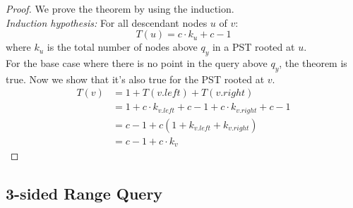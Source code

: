 \begin{proof}
We prove the theorem by using the induction.\\
\textit{Induction hypothesis:} For all descendant nodes $u$ of $v$:
\begin{equation*}
    T(u) = c\cdot k_u + c-1
\end{equation*}
where $k_u$ is the total number of nodes above $q_y$ in a PST rooted at $u$.\\

For the base case where there is no point in the query above $q_y$, the theorem is true. Now we show that it's also true for the PST rooted at $v$.
\begin{align*}
    T(v) &= 1 + T(v.left)+ T(v.right)\\
    &= 1 + c\cdot k_{v.left} + c-1 + c\cdot k_{v.right} + c-1 \\
    &= c-1 + c(1+k_{v.left}+k_{v.right})\\
    &= c-1 + c\cdot k_v
\end{align*}
\end{proof}

\subsection{3-sided Range Query}

